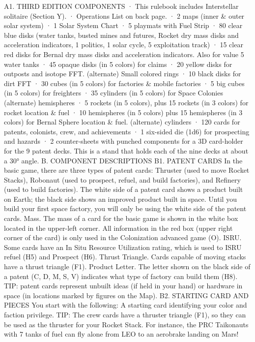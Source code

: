\documentclass[a4paper]{book}
\begin{document}
A1. THIRD EDITION COMPONENTS
·   This rulebook includes Interstellar solitaire (Section Y).
·   Operations List on back page.
·   2 maps (inner \& outer solar system)
·   1 Solar System Chart
·   5 playmats with Fuel Strip
·   80 clear blue disks (water tanks, busted mines and futures, Rocket dry mass disks and  acceleration indicators, 1 politics, 1 solar cycle, 5 exploitation track)
·   15 clear red disks for Bernal dry mass disks and acceleration indicators. Also for value 5 water tanks
·   45 opaque disks (in 5 colors) for claims
·   20 yellow disks for outposts and isotope FFT. (alternate) Small colored rings
·   10 black disks for dirt FFT
·   30 cubes (in 5 colors) for factories \& mobile factories
·   5 big cubes (in 5 colors) for freighters
·   35 cylinders (in 5 colors) for Space Colonies (alternate) hemispheres
·   5 rockets (in 5 colors), plus 15 rockets (in 3 colors) for rocket location \& fuel
·  10 hemispheres (in 5 colors) plus 15 hemispheres (in 3 colors) for Bernal Sphere location \& fuel. (alternate) cylinders
·   120 cards for patents, colonists, crew, and achievements
·   1 six-sided die (1d6) for prospecting and hazards
·   2 counter-sheets with punched components for a 3D card-holder for the 9 patent decks. This is a stand that holds each of the nine decks at about a 30° angle.
B. COMPONENT DESCRIPTIONS
B1. PATENT CARDS
In the basic game, there are three types of patent cards: Thruster (used to move Rocket Stacks), Robonaut (used to prospect, refuel, and build factories), and Refinery (used to build factories).
The white side of a patent card shows a product built on Earth; the black side shows an improved product built in space. Until you build your first space factory, you will only be using the white side of the patent cards.
Mass. The mass of a card for the basic game is shown in the white box located in the upper-left corner. All information in the red box (upper right corner of the card) is only used in the Colonization advanced game (O).
ISRU. Some cards have an In Situ Resource Utilization rating, which is used to ISRU refuel (H5) and Prospect (H6).
Thrust Triangle. Cards capable of moving stacks have a thrust triangle (F1).
Product Letter. The letter shown on the black side of a patent (C, D, M, S, V) indicates what type of factory can build them (H8).
TIP: patent cards represent unbuilt ideas (if held in your hand) or hardware in space (in locations marked by figures on the Map).
B2. STARTING CARD AND PIECES
You start with the following:
A starting card identifying your color and faction privilege.
TIP: The crew cards have a thruster triangle (F1), so they can be used as the thruster for your Rocket Stack. For instance, the PRC Taikonauts with 7 tanks of fuel can fly alone from LEO to an aerobrake landing on Mars!
\end{document}
